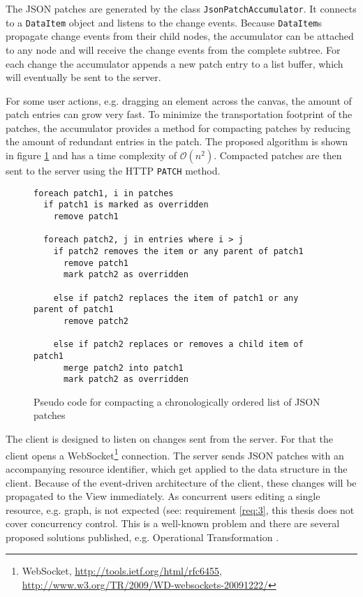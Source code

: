 The JSON patches are generated by the class \texttt{JsonPatchAccumulator}. It connects to a \texttt{DataItem} object and listens to the change events. Because \texttt{DataItem}s propagate change events from their child nodes, the accumulator can be attached to any node and will receive the change events from the complete subtree. For each change the accumulator appends a new patch entry to a list buffer, which will eventually be sent to the server.

For some user actions, e.g. dragging an element across the canvas, the amount of patch entries can grow very fast. To minimize the transportation footprint of the patches, the accumulator provides a method for compacting patches by reducing the amount of redundant entries in the patch. The proposed algorithm is shown in figure \ref{fig:patchcompact} and has a time complexity of $\mathcal O(n^2)$. Compacted patches are then sent to the server using the HTTP \texttt{PATCH} method.

\begin{figure}
\begin{lstlisting}[language=pseudo]
foreach patch1, i in patches
  if patch1 is marked as overridden
    remove patch1
  
  foreach patch2, j in entries where i > j
    if patch2 removes the item or any parent of patch1
      remove patch1
      mark patch2 as overridden
      
    else if patch2 replaces the item of patch1 or any parent of patch1
      remove patch2
     
    else if patch2 replaces or removes a child item of patch1
      merge patch2 into patch1
      mark patch2 as overridden    
\end{lstlisting}
\caption{Pseudo code for compacting a chronologically ordered list of JSON patches}
\label{fig:patchcompact}
\end{figure}

The client is designed to listen on changes sent from the server. For that the client opens a WebSocket\footnote{WebSocket, \url{http://tools.ietf.org/html/rfc6455}, \url{http://www.w3.org/TR/2009/WD-websockets-20091222/}} connection. The server sends JSON patches with an accompanying resource identifier, which get applied to the data structure in the client. Because of the event-driven architecture of the client, these changes will be propagated to the View immediately. As concurrent users editing a single resource, e.g. graph, is not expected (see: requirement \ref{req:3}, this thesis does not cover concurrency control. This is a well-known problem and there are several proposed solutions published, e.g. Operational Transformation \cite{Ellis_1989}.

